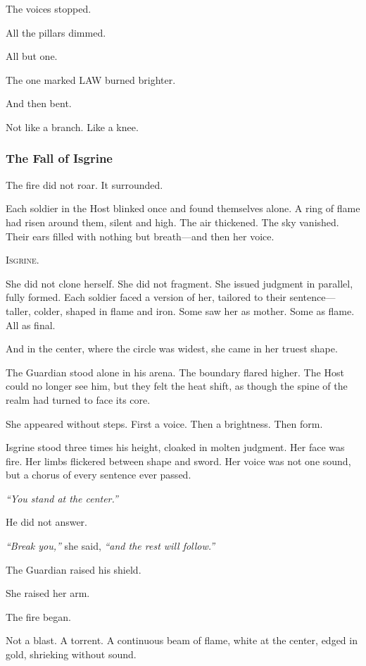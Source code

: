 \documentclass[12pt]{article}
\begin{document}
The voices stopped.

All the pillars dimmed.

All but one.

The one marked \textsc{LAW} burned brighter.

And then bent.

Not like a branch. Like a knee.


\dotfill

\subsubsection{The Fall of Isgrine}

The fire did not roar. It surrounded.

Each soldier in the Host blinked once and found themselves alone. A ring of flame had risen around them, silent and high. The air thickened. The sky vanished. Their ears filled with nothing but breath—and then her voice.

\textsc{Isgrine.}

She did not clone herself. She did not fragment. She issued judgment in parallel, fully formed. Each soldier faced a version of her, tailored to their sentence—taller, colder, shaped in flame and iron. Some saw her as mother. Some as flame. All as final.

And in the center, where the circle was widest, she came in her truest shape.

The Guardian stood alone in his arena. The boundary flared higher. The Host could no longer see him, but they felt the heat shift, as though the spine of the realm had turned to face its core.

She appeared without steps. First a voice. Then a brightness. Then form.

Isgrine stood three times his height, cloaked in molten judgment. Her face was fire. Her limbs flickered between shape and sword. Her voice was not one sound, but a chorus of every sentence ever passed.

\textit{``You stand at the center.''}

He did not answer.

\textit{``Break you,''} she said, \textit{``and the rest will follow.''}

The Guardian raised his shield.

She raised her arm.

The fire began.

Not a blast. A torrent. A continuous beam of flame, white at the center, edged in gold, shrieking without sound.
\end{document}
